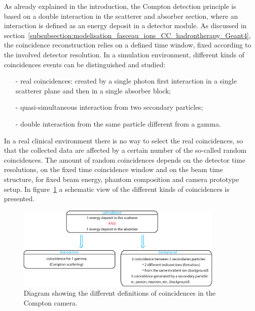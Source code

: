As already explained in the introduction, the Compton detection principle is based on a double interaction in the scatterer and absorber section, where an interaction is defined as an energy deposit in a detector module. As discussed in section~\ref{subsubsection:modelisation_fasceau_ions_CC_hadrontherapy_Geant4}, the coincidence reconstruction relies on a defined time window, fixed according to the involved detector resolution. In a simulation environment, different kinds of coincidences events can be distinguished and studied: 
\begin{itemize}
\item[-] real coincidences: created by a single photon first interaction in a single scatterer plane and then in a single absorber block;
\item[-] quasi-simultaneous interaction from two secondary particles;
\item[-] double interaction from the same particle different from a gamma.
\end{itemize}

In a real clinical environment there is no way to select the real coincidences, so that the collected data are affected by a certain number of the so-called random coincidences. The amount of random coincidences depends on the detector time resolutions, on the fixed time coincidence window and on the beam time structure, for fixed beam energy, phantom composition and camera prototype setup. In figure~\ref{fig:fig_explication_coincidence_CC_simulation_Hadronth} a schematic view of the different kinds of coincidences is presented.

\begin{figure} [!hbtp]	
  \centering
  \includegraphics[width=0.9\textwidth]{./Figure/Schema_coincidence_EN.eps}
  \caption{Diagram showing the different definitions of coincidences in the Compton camera.}
  \label{fig:fig_explication_coincidence_CC_simulation_Hadronth}
\end{figure}

